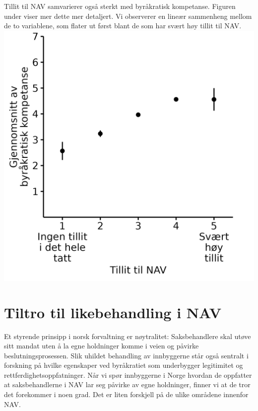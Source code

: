 \documentclass[
]{book}
\begin{document}
Tillit til NAV samvarierer også sterkt med byråkratisk kompetanse.
Figuren under viser mer dette mer detaljert.
Vi observerer en lineær sammenheng mellom de to variablene, som flater ut først blant de som har svært høy tillit til NAV.
\includegraphics{figs/png/fig_be_by_navtrust.png}

\hypertarget{tiltro-til-likebehandling-i-nav}{%
\section{Tiltro til likebehandling i NAV}\label{tiltro-til-likebehandling-i-nav}}

Et styrende prinsipp i norsk forvaltning er nøytralitet:
Saksbehandlere skal utøve sitt mandat uten å la egne holdninger komme i veien og påvirke beslutningsprosessen.
Slik uhildet behandling av innbyggerne står også sentralt i forskning på hvilke egenskaper ved byråkratiet som underbygger legitimitet og rettferdighetsoppfatninger.
Når vi spør innbyggerne i Norge hvordan de oppfatter at saksbehandlerne i NAV lar seg påvirke av egne holdninger, finner vi at de tror det forekommer i noen grad.
Det er liten forskjell på de ulike områdene innenfor NAV.
\end{document}

